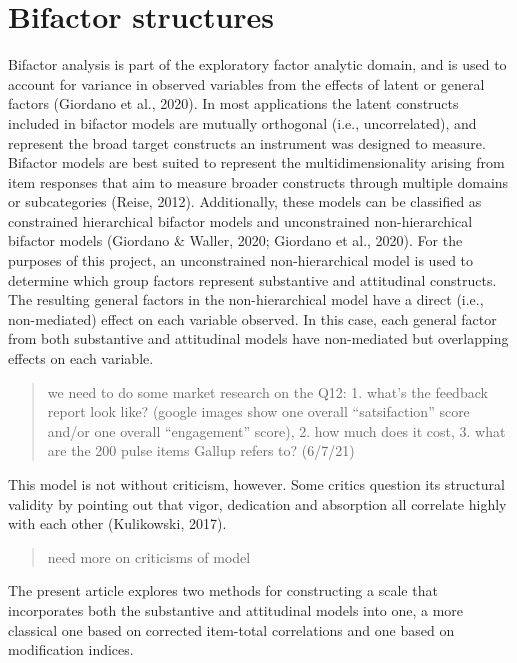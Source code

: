 \documentclass[
  english,
  man]{apa7}
\begin{document}
\hypertarget{bifactor-structures}{%
\section{Bifactor structures}\label{bifactor-structures}}

Bifactor analysis is part of the exploratory factor analytic domain, and is used to account for variance in observed variables from the effects of latent or general factors (Giordano et al., 2020). In most applications the latent constructs included in bifactor models are mutually orthogonal (i.e., uncorrelated), and represent the broad target constructs an instrument was designed to measure. Bifactor models are best suited to represent the multidimensionality arising from item responses that aim to measure broader constructs through multiple domains or subcategories (Reise, 2012). Additionally, these models can be classified as constrained hierarchical bifactor models and unconstrained non-hierarchical bifactor models (Giordano \& Waller, 2020; Giordano et al., 2020). For the purposes of this project, an unconstrained non-hierarchical model is used to determine which group factors represent substantive and attitudinal constructs. The resulting general factors in the non-hierarchical model have a direct (i.e., non-mediated) effect on each variable observed. In this case, each general factor from both substantive and attitudinal models have non-mediated but overlapping effects on each variable.

\begin{quote}
we need to do some market research on the Q12: 1. what's the feedback report look like? (google images show one overall ``satsifaction'' score and/or one overall ``engagement'' score), 2. how much does it cost, 3. what are the 200 pulse items Gallup refers to? (6/7/21)
\end{quote}

This model is not without criticism, however. Some critics question its structural validity by pointing out that vigor, dedication and absorption all correlate highly with each other (Kulikowski, 2017).

\begin{quote}
need more on criticisms of model
\end{quote}

The present article explores two methods for constructing a scale that incorporates both the substantive and attitudinal models into one, a more classical one based on corrected item-total correlations and one based on modification indices.
\end{document}
